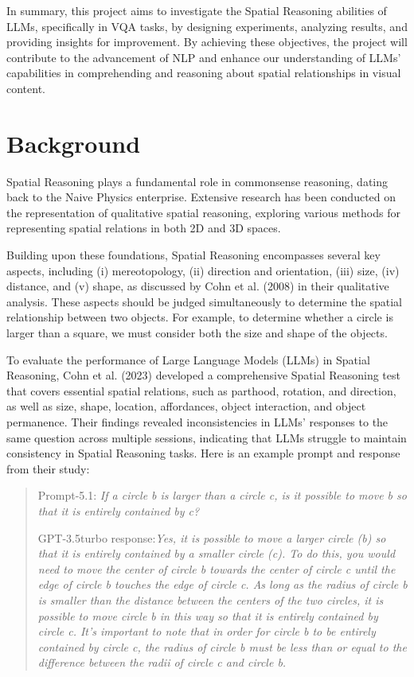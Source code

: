 \documentclass[twocolumn,11pt]{report}
\begin{document}
In summary, this project aims to investigate the Spatial Reasoning abilities of LLMs, specifically in VQA tasks, by designing experiments, analyzing results, and providing insights for improvement. By achieving these objectives, the project will contribute to the advancement of NLP and enhance our understanding of LLMs' capabilities in comprehending and reasoning about spatial relationships in visual content.

\chapter{Background}\label{chap:background}
Spatial Reasoning plays a fundamental role in commonsense reasoning, dating back to the Naive Physics enterprise\cite{Hobbs1985-HOBFTO}. Extensive research has been conducted on the representation of qualitative spatial reasoning\cite{chen2015survey}, exploring various methods for representing spatial relations in both 2D and 3D spaces.


Building upon these foundations, Spatial Reasoning encompasses several key aspects, including (i) mereotopology, (ii) direction and orientation, (iii) size, (iv) distance, and (v) shape, as discussed by Cohn et al. (2008) in their qualitative analysis\cite{cohn2008qualitative}. These aspects should be judged simultaneously to determine the spatial relationship between two objects. For example, to determine whether a circle is larger than a square, we must consider both the size and shape of the objects. 

To evaluate the performance of Large Language Models (LLMs) in Spatial Reasoning, Cohn et al. (2023) developed a comprehensive Spatial Reasoning test that covers essential spatial relations, such as parthood, rotation, and direction, as well as size, shape, location, affordances, object interaction, and object permanence\cite{cohn2023dialectical}. Their findings revealed inconsistencies in LLMs' responses to the same question across multiple sessions, indicating that LLMs struggle to maintain consistency in Spatial Reasoning tasks. Here is an example prompt and response from their study:
\begin{quotation}
    Prompt-5.1: \emph{If a circle b is larger than a circle c, is it possible to move b so that it is entirely contained by c?}

    GPT-3.5turbo response:\emph{Yes, it is possible to move a larger circle (b) so that it is entirely contained by a smaller circle (c). To do this, you would need to move the 
    center of circle b towards the center of circle c until the edge of circle b touches the edge of circle c. As long as the radius of circle b is smaller than the distance between the centers of the two circles, it is possible to move circle b in this way so that it is entirely contained by circle c. It’s important to note that in order for circle b to be entirely contained by circle c, the radius of circle b must be less than or equal to the 
    difference between the radii of circle c and circle b.}
\end{quotation}
\end{document}
